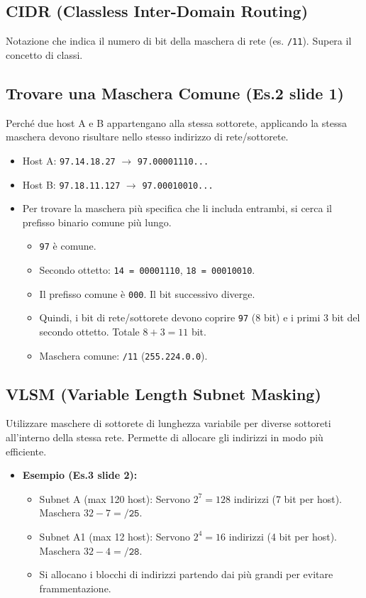 \documentclass{article}
\begin{document}
\subsection{CIDR (Classless Inter-Domain Routing)}
Notazione che indica il numero di bit della maschera di rete (es. \texttt{/11}). Supera il concetto di classi.

\subsection{Trovare una Maschera Comune (Es.2 slide 1)}
Perché due host A e B appartengano alla stessa sottorete, applicando la stessa maschera devono risultare nello stesso indirizzo di rete/sottorete.
\begin{itemize}
    \item Host A: \texttt{97.14.18.27} $\rightarrow$ \texttt{97.00001110...}
    \item Host B: \texttt{97.18.11.127} $\rightarrow$ \texttt{97.00010010...}
    \item Per trovare la maschera più specifica che li includa entrambi, si cerca il prefisso binario comune più lungo.
    \begin{itemize}
        \item \texttt{97} è comune.
        \item Secondo ottetto: \texttt{14 = 00001110}, \texttt{18 = 00010010}.
        \item Il prefisso comune è \texttt{000}. Il bit successivo diverge.
        \item Quindi, i bit di rete/sottorete devono coprire \texttt{97} (8 bit) e i primi 3 bit del secondo ottetto. Totale $8 + 3 = 11$ bit.
        \item Maschera comune: \texttt{/11} (\texttt{255.224.0.0}).
    \end{itemize}
\end{itemize}

\subsection{VLSM (Variable Length Subnet Masking)}
Utilizzare maschere di sottorete di lunghezza variabile per diverse sottoreti all'interno della stessa rete. Permette di allocare gli indirizzi in modo più efficiente.
\begin{itemize}
    \item \textbf{Esempio (Es.3 slide 2):}
    \begin{itemize}
        \item Subnet A (max 120 host): Servono $2^7 = 128$ indirizzi (7 bit per host). Maschera $32 - 7 = \texttt{/25}$.
        \item Subnet A1 (max 12 host): Servono $2^4 = 16$ indirizzi (4 bit per host). Maschera $32 - 4 = \texttt{/28}$.
        \item Si allocano i blocchi di indirizzi partendo dai più grandi per evitare frammentazione.
    \end{itemize}
\end{itemize}
\end{document}
